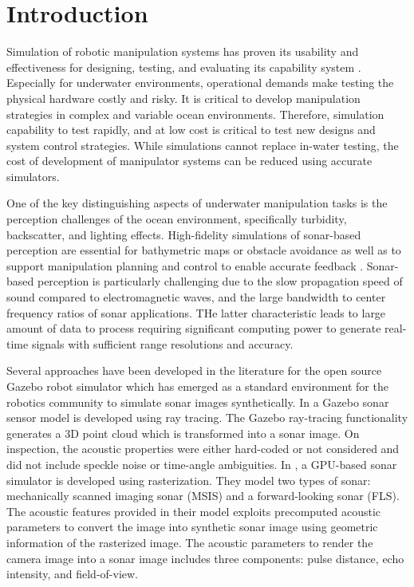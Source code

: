 \documentclass[utf8]{frontiersSCNS} %
\begin{document}
\section{Introduction}
Simulation of robotic manipulation systems has proven its usability and effectiveness for designing, testing, and evaluating its capability system \citep{cook2014survey}. Especially for underwater environments, operational demands make testing the physical hardware costly and risky. It is critical to develop manipulation strategies in complex and variable ocean environments. Therefore, simulation capability to test rapidly, and at low cost is critical to test new designs and system control strategies. While simulations cannot replace in-water testing, the cost of development of manipulator systems can be reduced using accurate simulators.

One of the key distinguishing aspects of underwater manipulation tasks is the perception challenges of the ocean environment, specifically turbidity, backscatter, and lighting effects.  High-fidelity simulations of sonar-based perception are essential for bathymetric maps or obstacle avoidance as well as to support manipulation planning and control to enable accurate feedback \citep{manhaes2016uuv}. Sonar-based perception is particularly challenging due to the slow propagation speed of sound compared to electromagnetic waves, and the large  bandwidth to center frequency ratios of sonar applications. THe latter characteristic leads to large amount of data to process requiring significant computing power to generate real-time signals with sufficient range resolutions and accuracy.

Several approaches have been developed in the literature for the open source Gazebo robot simulator \citep{koenig04gazebo} which has emerged as a standard environment for the robotics community to simulate sonar images synthetically. In \cite{demarco15computationally} a Gazebo sonar sensor model is developed using ray tracing. The Gazebo ray-tracing functionality generates a 3D point cloud which is transformed into a sonar image. On inspection, the acoustic properties were either hard-coded or not considered and did not include speckle noise or time-angle ambiguities. In \cite{cerqueira17novel, cerqueira20rasterized}, a GPU-based sonar simulator is developed using rasterization. They model two types of sonar: mechanically scanned imaging sonar (MSIS) and a forward-looking sonar (FLS). The acoustic features provided in their model exploits precomputed acoustic parameters to convert the image into synthetic sonar image using geometric information of the rasterized image. The acoustic parameters to render the camera image into a sonar image includes three components: pulse distance, echo intensity, and field-of-view. 
\end{document}
